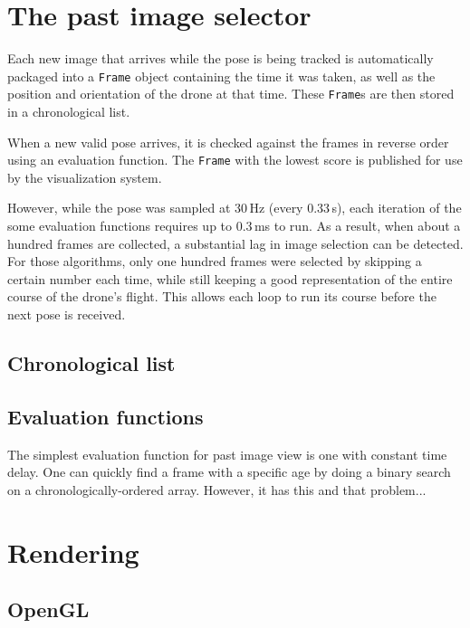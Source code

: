 \section{The past image selector}
  Each new image that arrives while the pose is being tracked is automatically packaged into a \texttt{Frame} object containing the time it was taken, as well as the position and orientation of the drone at that time.
  These \texttt{Frame}s are then stored in a chronological list.

  When a new valid pose arrives, it is checked against the frames in reverse order using an evaluation function.
  The \texttt{Frame} with the lowest score is published for use by the visualization system.

  However, while the pose was sampled at 30\,Hz (every 0.33\,s), each iteration of the some evaluation functions requires up to 0.3\,ms to run.
  As a result, when about a hundred frames are collected, a substantial lag in image selection can be detected.
  For those algorithms, only one hundred frames were selected by skipping a certain number each time, while still keeping a good representation of the entire course of the drone's flight.
  This allows each loop to run its course before the next pose is received.

  \subsection{Chronological list}

  \subsection{Evaluation functions}
    The simplest evaluation function for past image view is one with constant time delay.
    One can quickly find a frame with a specific age by doing a binary search on a chronologically-ordered array.
    However, it has this and that problem...


\section{Rendering}
  \subsection{OpenGL}

